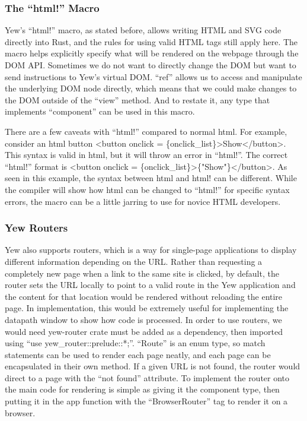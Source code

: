 \documentclass[
    parskip=half,
    fontsize=12pt,
    titlepage=firstiscover,
    toc=bibliography,
    numbers=endperiod
]{scrartcl}
\begin{document}
\subsubsection{The ``html!'' Macro}
\label{subsec:html-macro}

Yew's ``html!'' macro, as stated before, allows writing HTML and SVG
code directly into Rust, and the rules for using valid HTML tags still
apply here. The macro helps explicitly specify what will be rendered on
the webpage through the DOM API. Sometimes we do not want to directly
change the DOM but want to send instructions to Yew's virtual DOM.
``ref'' allows us to access and manipulate the underlying DOM node
directly, which means that we could make changes to the DOM outside of
the ``view'' method. And to restate it, any type that implements
``component'' can be used in this macro.

There are a few caveats with ``html!'' compared to normal html. For
example, consider an html button \textless button onclick =
\{onclick\_list\}\textgreater Show\textless/button\textgreater. This
syntax is valid in html, but it will throw an error in ``html!''. The
correct ``html!'' format is \textless button onclick =
\{onclick\_list\}\textgreater\{"Show"\}\textless/button\textgreater. As
seen in this example, the syntax between html and html! can be
different. While the compiler will show how html can be changed to
``html!'' for specific syntax errors, the macro can be a little jarring
to use for novice HTML developers.

\subsubsection{Yew Routers}

Yew also supports routers, which is a way for single-page applications
to display different information depending on the URL. Rather than
requesting a completely new page when a link to the same site is
clicked, by default, the router sets the URL locally to point to a valid
route in the Yew application and the content for that location would be
rendered without reloading the entire page. In implementation, this
would be extremely useful for implementing the datapath window to show
how code is processed. In order to use routers, we would need yew-router
crate must be added as a dependency, then imported using ``use
yew\_router::prelude::*;''. ``Route'' is an enum type, so match
statements can be used to render each page neatly, and each page can be
encapsulated in their own method. If a given URL is not found, the
router would direct to a page with the ``not found'' attribute. To
implement the router onto the main code for rendering is simple as
giving it the component type, then putting it in the app function with
the ``BrowserRouter'' tag to render it on a browser.
\end{document}
